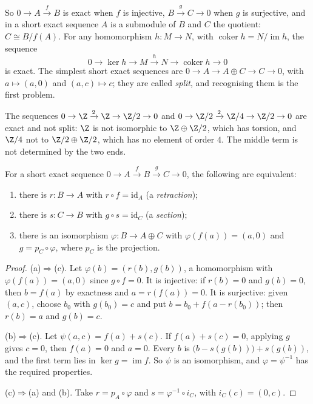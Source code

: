 So $0\to A\xrightarrow fB$ is exact when $f$ is injective, $B\xrightarrow gC\to0$ when $g$ is surjective, and in a short exact sequence $A$ is a submodule of $B$ and $C$ the quotient: $C\cong B/f(A)$. For
any homomorphism $h\colon M\to N$, with $\operatorname{coker}h=N/\operatorname{im}h$, the sequence
\[0\to\ker h\to M\xrightarrow hN\to\operatorname{coker}h\to0\]
is exact. The simplest short exact sequences are $0\to A\to A\oplus C\to C\to0$, with $a\mapsto(a,0)$ and $(a,c)\mapsto c$; they are called \emph{split}, and recognising them is the first problem.

\begin{example}\label{ex:ses}
The sequences $0\to\Z\xrightarrow{2}\Z\to\Z/2\to0$ and $0\to\Z/2\xrightarrow{2}\Z/4\to\Z/2\to0$ are exact and not split: $\Z$ is not isomorphic to $\Z\oplus\Z/2$, which has torsion, and $\Z/4$
not to $\Z/2\oplus\Z/2$, which has no element of order $4$. The middle term is not determined by the two ends.
\end{example}

\begin{proposition}\label{prop:split}
For a short exact sequence $0\to A\xrightarrow fB\xrightarrow gC\to0$, the following are equivalent:
\begin{enumerate}[label=(\alph*)]
\item there is $r\colon B\to A$ with $r\circ f=\mathrm{id}_A$ (a \emph{retraction});
\item there is $s\colon C\to B$ with $g\circ s=\mathrm{id}_C$ (a \emph{section});
\item there is an isomorphism $\varphi\colon B\to A\oplus C$ with $\varphi(f(a))=(a,0)$ and $g=p_C\circ\varphi$, where $p_C$ is the projection.
\end{enumerate}
\end{proposition}

\begin{proof}
(a)$\Rightarrow$(c). Let $\varphi(b)=(r(b),g(b))$, a homomorphism with $\varphi(f(a))=(a,0)$ since $g\circ f=0$. It is injective: if $r(b)=0$ and $g(b)=0$, then $b=f(a)$ by exactness and $a=r(f(a))=0$. It is surjective: given
$(a,c)$, choose $b_0$ with $g(b_0)=c$ and put $b=b_0+f(a-r(b_0))$; then $r(b)=a$ and $g(b)=c$.

(b)$\Rightarrow$(c). Let $\psi(a,c)=f(a)+s(c)$. If $f(a)+s(c)=0$, applying $g$ gives $c=0$, then $f(a)=0$ and $a=0$. Every $b$ is $\bigl(b-s(g(b))\bigr)+s(g(b))$, and the first term lies in $\ker g=\operatorname{im}f$. So $\psi$ is an
isomorphism, and $\varphi=\psi^{-1}$ has the required properties.

(c)$\Rightarrow$(a) and (b). Take $r=p_A\circ\varphi$ and $s=\varphi^{-1}\circ i_C$, with $i_C(c)=(0,c)$.
\end{proof}

